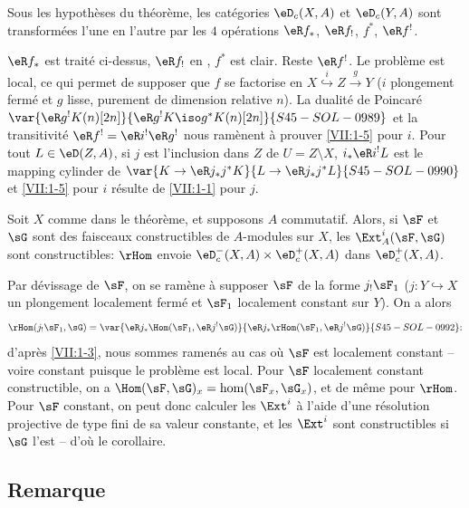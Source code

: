 \begin{corollary_}\label{VII:1-5}
Sous les hypothèses du théorème, les catégories $\eD_c(X,A)$ et 
$\eD_c(Y,A)$ sont transformées l'une en l'autre par les $4$ opérations 
$\eR f_\ast$, $\eR f_!$, $f^\ast$, $\eR f^!$. 
\end{corollary_}

$\eR f_\ast$ est traité ci-dessus, $\eR f_!$ en \cite[XVII 5.3]{sga4}, 
$f^\ast$ est clair. Reste $\eR f^!$. Le problème est local, ce qui permet de 
supposer que $f$ se factorise en $X\overset{i}{\hookrightarrow} Z \xrightarrow g Y$ ($i$ 
plongement fermé et $g$ lisse, purement de dimension relative $n$). La 
dualité de Poincaré $\var{\eR g^! K(n)[2 n]}{\eR g^! K \iso g^\ast K(n)[2 n]}{S45-SOL-0989}$ et la transitivité 
$\eR f^! = \eR i^! \eR g^!$ nous ramènent à prouver \ref{VII:1-5} pour $i$. 
Pour tout $L\in \eD(Z,A)$, si $j$ est l'inclusion dans $Z$ de $U=Z\setminus X$, 
$i_\ast \eR i^! L$ est le mapping cylinder de $\var{K\to \eR j_\ast j^\ast K}{L\to \eR j_\ast j^\ast L}{S45-SOL-0990}$ et 
\ref{VII:1-5} pour $i$ résulte de \ref{VII:1-1} pour $j$. 





\begin{corollary_}\label{VII:1-6}
Soit $X$ comme dans le théorème, et supposons $A$ commutatif. Alors, si 
$\sF$ et $\sG$ sont des faisceaux constructibles de $A$-modules sur $X$, les 
$\Ext_A^i(\sF,\sG)$ sont constructibles: $\rHom$ envoie 
$\eD_c^-(X,A)\times \eD_c^+(X,A)$ dans $\eD_c^+(X,A)$. 
\end{corollary_}

Par dévissage de $\sF$, on se ramène à supposer $\sF$ de la forme 
$j_!\sF_1$ ($j:Y\hookrightarrow X$ un plongement localement fermé et $\sF_1$ 
localement constant sur $Y$). On a alors 
\[
  \rHom(j_! \sF_1,\sG) = \var{\eR j_\ast \Hom(\sF_1,\eR j^! \sG)}{\eR j_\ast \rHom(\sF_1,\eR j^! \sG)}{S45-SOL-0992} \text{:} 
\]
d'après \ref{VII:1-3}, nous sommes ramenés au cas où $\sF$ est localement 
constant -- voire constant puisque le problème est local. Pour $\sF$ 
localement constant constructible, on a $\Hom(\sF,\sG)_x=\hom(\sF_x,\sG_x)$, 
et de même pour $\rHom$. Pour $\sF$ constant, on peut donc calculer les 
$\Ext^i$ à l'aide d'une résolution projective de type fini de sa valeur 
constante, et les $\Ext^i$ sont constructibles si $\sG$ l'est -- d'où le 
corollaire. 





\subsection{Remarque}\label{VII:1-7}

